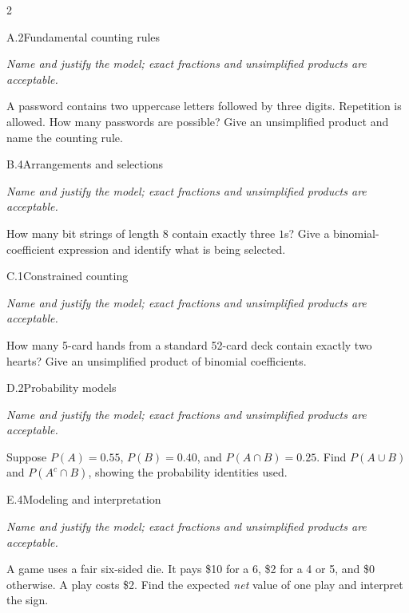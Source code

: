 \documentclass[9pt]{extarticle}
\begin{document}
\CoreWorkArea
\FormBreak
{}
\begin{multicols}{2}
\begin{CoreProblem}{A.2}{Fundamental counting rules}
{\scriptsize\textit{Name and justify the model; exact fractions and unsimplified products are acceptable.}\par}
A password contains two uppercase letters followed by three digits.
    Repetition is allowed. How many passwords are possible? Give an unsimplified
    product and name the counting rule.
\end{CoreProblem}
\begin{CoreProblem}{B.4}{Arrangements and selections}
{\scriptsize\textit{Name and justify the model; exact fractions and unsimplified products are acceptable.}\par}
How many bit strings of length 8 contain exactly three $1$s? Give a
    binomial-coefficient expression and identify what is being selected.
\end{CoreProblem}
\begin{CoreProblem}{C.1}{Constrained counting}
{\scriptsize\textit{Name and justify the model; exact fractions and unsimplified products are acceptable.}\par}
How many 5-card hands from a standard 52-card deck contain exactly
    two hearts? Give an unsimplified product of binomial coefficients.
\end{CoreProblem}
\columnbreak
\begin{CoreProblem}{D.2}{Probability models}
{\scriptsize\textit{Name and justify the model; exact fractions and unsimplified products are acceptable.}\par}
Suppose $P(A)=0.55$, $P(B)=0.40$, and $P(A\cap B)=0.25$. Find
    $P(A\cup B)$ and $P(A^c\cap B)$, showing the probability identities used.
\end{CoreProblem}
\begin{CoreProblem}{E.4}{Modeling and interpretation}
{\scriptsize\textit{Name and justify the model; exact fractions and unsimplified products are acceptable.}\par}
A game uses a fair six-sided die. It pays \$10 for a 6, \$2 for a 4
    or 5, and \$0 otherwise. A play costs \$2. Find the expected \emph{net}
    value of one play and interpret the sign.
\end{CoreProblem}
\end{multicols}
\CoreWorkArea
\FormBreak
{}
\end{document}
